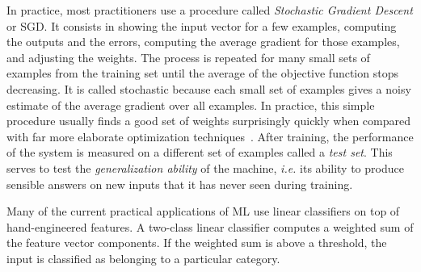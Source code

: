 \documentclass[10pts]{article}
\newcommand{\citep}[1]{\cite{#1}}
\begin{document}
In practice, most practitioners use a procedure called {\em Stochastic
  Gradient Descent} or SGD. It consists in showing the input vector
for a few examples, computing the outputs and the errors, computing
the average gradient for those examples, and adjusting the
weights. The process is repeated for many small sets of examples
from the training set until the average of the objective function stops
decreasing. It is called stochastic because each small set of examples
gives a noisy estimate of the average gradient over all examples. In
practice, this simple procedure usually finds a good set of weights
surprisingly quickly when compared with far more elaborate
optimization techniques~\cite{bottou-bousquet-2008-small}. After
training, the performance of the system is measured on a different set
of examples called a {\em test set}. This serves to test the {\em
  generalization ability} of the machine, {\it i.e.} its ability to
produce sensible answers on new inputs that it has never seen during
training.

Many of the current practical applications of ML use linear classifiers on top of
hand-engineered features. A two-class linear classifier computes a
weighted sum of the feature vector components. If the weighted sum is
above a threshold, the input is classified as belonging to a
particular category. %
\end{document}
